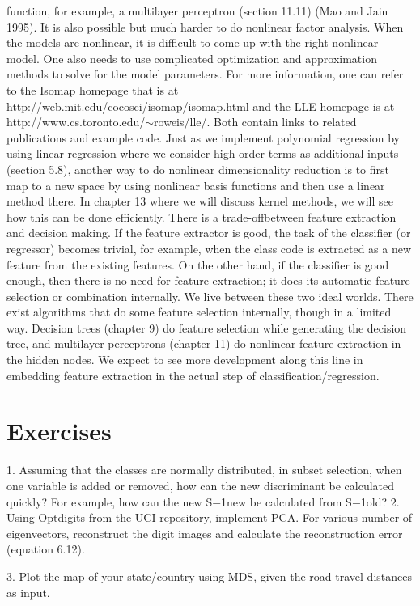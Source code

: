 function, for example, a multilayer perceptron (section 11.11) (Mao and Jain 1995). It is also possible but much harder to do nonlinear factor analysis. When the models are nonlinear, it is difficult to come up with the right nonlinear model. One also needs to use complicated optimization and approximation methods to solve for the model parameters. For more information, one can refer to the Isomap homepage that is at http://web.mit.edu/cocosci/isomap/isomap.html and the LLE homepage is at http://www.cs.toronto.edu/$\sim$roweis/lle/. Both contain links to related publications and example code. Just as we implement polynomial regression by using linear regression where we consider high-order terms as additional inputs (section 5.8), another way to do nonlinear dimensionality reduction is to first map to a new space by using nonlinear basis functions and then use a linear method there. In chapter 13 where we will discuss kernel methods, we will see how this can be done efficiently. There is a trade-offbetween feature extraction and decision making. If the feature extractor is good, the task of the classifier (or regressor) becomes trivial, for example, when the class code is extracted as a new feature from the existing features. On the other hand, if the classifier is good enough, then there is no need for feature extraction; it does its automatic feature selection or combination internally. We live between these two ideal worlds. There exist algorithms that do some feature selection internally, though in a limited way. Decision trees (chapter 9) do feature selection while generating the decision tree, and multilayer perceptrons (chapter 11) do nonlinear feature extraction in the hidden nodes. We expect to see more development along this line in embedding feature extraction in the actual step of classification/regression.

\section{Exercises}

1. Assuming that the classes are normally distributed, in subset selection, when one variable is added or removed, how can the new discriminant be calculated quickly? For example, how can the new S$-$1new be calculated from S$-$1old? 2. Using Optdigits from the UCI repository, implement PCA. For various number of eigenvectors, reconstruct the digit images and calculate the reconstruction error (equation 6.12).

3. Plot the map of your state/country using MDS, given the road travel distances as input.

